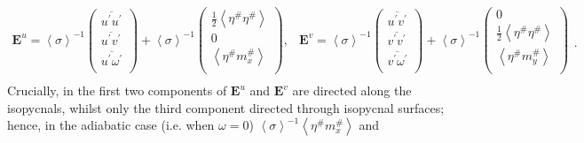 \documentclass[10pt,a4paper]{report}
\newcommand*\thkmean[1]{\overline{#1}}
\newcommand*\thkres[1]{{#1}^{\prime}}
\newcommand*\nthkmean[1]{\left\langle{#1}\right\rangle}
\newcommand*\nthkres[1]{{#1}^{\#}}
\newcommand*{\half}{\frac{1}{2}}
\begin{document}
                   \begin{equation}
                   \begin{array}{cc}
                   \boldsymbol{E}^{u}=\nthkmean{\sigma}^{-1}\left(
                   \begin{array}{c}
                   \thkmean{\thkres{u}\thkres{u}} \\
                   \thkmean{\thkres{u}\thkres{v}} \\
                    \thkmean{\thkres{u}\thkres{\omega}} \\
                   \end{array}\right)+\nthkmean{\sigma}^{-1}\left(
                   \begin{array}{c}
                   \half \nthkmean{\nthkres{\eta}\nthkres{\eta}} \\
                   0 \\
                   \nthkmean{\nthkres{\eta}\nthkres{m}_{x}} \\
                   \end{array}\right), &
                   \boldsymbol{E}^{v}=\nthkmean{\sigma}^{-1}\left(
                   \begin{array}{c}
                   \thkmean{\thkres{u}\thkres{v}} \\
                   \thkmean{\thkres{v}\thkres{v}} \\
                   \thkmean{\thkres{v}\thkres{\omega}} \\
                   \end{array}\right)+\nthkmean{\sigma}^{-1}\left(
                   \begin{array}{c}
                   0\\
                   \half \nthkmean{\nthkres{\eta}\nthkres{\eta}} \\
                   \nthkmean{\nthkres{\eta}\nthkres{m}_{y}} \\
                   \end{array}\right) \\
                   \end{array}.
                   \end{equation}
                   Crucially, in \cite{young2012exact} the first two components of  $\boldsymbol{E}^{u}$ and $\boldsymbol{E}^{v}$ are directed along 
                   the isopycnals, whilst only  the third component directed through 
                   isopycnal surfaces; hence, in the adiabatic case (i.e. when $\omega=0$)
                   $ \nthkmean{\sigma}^{-1}\nthkmean{\nthkres{\eta}\nthkres{m}_{x}}$ and 
\end{document}
